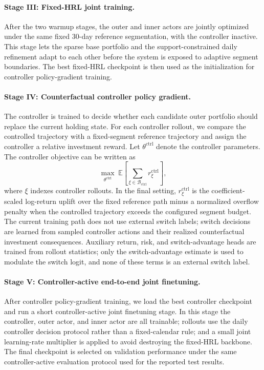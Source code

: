 \documentclass[letterpaper]{article} %
\begin{document}
\paragraph{Stage III: Fixed-HRL joint training.}
After the two warmup stages, the outer and inner actors are jointly optimized under the same fixed 30-day reference segmentation, with the controller inactive. This stage lets the sparse base portfolio and the support-constrained daily refinement adapt to each other before the system is exposed to adaptive segment boundaries. The best fixed-HRL checkpoint is then used as the initialization for controller policy-gradient training.

\paragraph{Stage IV: Counterfactual controller policy gradient.}
The controller is trained to decide whether each candidate outer portfolio should replace the current holding state. For each controller rollout, we compare the controlled trajectory with a fixed-segment reference trajectory and assign the controller a relative investment reward. Let \(\theta^{\mathrm{ctrl}}\) denote the controller parameters. The controller objective can be written as
\[
\max_{\theta^{\mathrm{ctrl}}}
\;
\mathbb{E}\!\left[
\sum_{\xi\in\mathcal{B}_{\mathrm{ctrl}}}
r_{\xi}^{\mathrm{ctrl}}
\right],
\]
where \(\xi\) indexes controller rollouts. In the final setting, \(r_{\xi}^{\mathrm{ctrl}}\) is the coefficient-scaled log-return uplift over the fixed reference path minus a normalized overflow penalty when the controlled trajectory exceeds the configured segment budget. The current training path does not use external switch labels; switch decisions are learned from sampled controller actions and their realized counterfactual investment consequences. Auxiliary return, risk, and switch-advantage heads are trained from rollout statistics; only the switch-advantage estimate is used to modulate the switch logit, and none of these terms is an external switch label.

\paragraph{Stage V: Controller-active end-to-end joint finetuning.}
After controller policy-gradient training, we load the best controller checkpoint and run a short controller-active joint finetuning stage. In this stage the controller, outer actor, and inner actor are all trainable; rollouts use the daily controller decision protocol rather than a fixed-calendar rule; and a small joint learning-rate multiplier is applied to avoid destroying the fixed-HRL backbone. The final checkpoint is selected on validation performance under the same controller-active evaluation protocol used for the reported test results.
\end{document}
